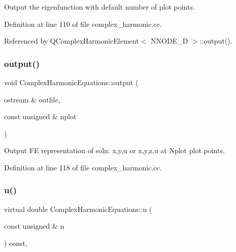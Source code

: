 Output the eigenfunction with default number of plot points. 



Definition at line 110 of file complex\+\_\+harmonic.\+cc.



Referenced by Q\+Complex\+Harmonic\+Element$<$ N\+N\+O\+D\+E\+\_\+D $>$\+::output().

\mbox{\label{classComplexHarmonicEquations_a141e0a24096323472fcd10138b6fd5fa}} 
\subsubsection{\texorpdfstring{output()}{output()}\hspace{0.1cm}{\footnotesize\ttfamily [2/2]}}
{\footnotesize\ttfamily void Complex\+Harmonic\+Equations\+::output (\begin{DoxyParamCaption}\item[{ostream \&}]{outfile,  }\item[{const unsigned \&}]{nplot }\end{DoxyParamCaption})\hspace{0.3cm}{\ttfamily [inline]}}



Output FE representation of soln\+: x,y,u or x,y,z,u at Nplot plot points. 



Definition at line 118 of file complex\+\_\+harmonic.\+cc.

\mbox{\label{classComplexHarmonicEquations_af4ff638cb40e23c3574631423fd56bce}} 
\subsubsection{\texorpdfstring{u()}{u()}}
{\footnotesize\ttfamily virtual double Complex\+Harmonic\+Equations\+::u (\begin{DoxyParamCaption}\item[{const unsigned \&}]{n }\end{DoxyParamCaption}) const\hspace{0.3cm}{\ttfamily [inline]}, {\ttfamily [virtual]}}



